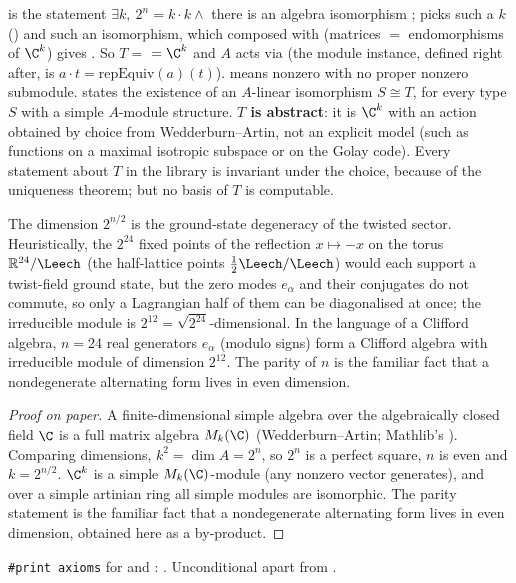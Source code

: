 \begin{dictionary}
 is the statement $\exists k,\ 2^n=k\cdot k\wedge$ there is an algebra
isomorphism ;  picks such a $k$
() and  such an isomorphism, which composed with
 (matrices $=$ endomorphisms of $\C^k$) gives .  So
$T=$  $=\C^k$ and $A$ acts via  (the module instance, defined right
after, is $a\cdot t=\mathrm{repEquiv}(a)(t)$).   means nonzero with no proper
nonzero submodule.   states the existence of an
$A$-linear isomorphism $S\cong T$, for every type $S$ with a simple $A$-module structure.
\textbf{$T$ is abstract}: it is $\C^k$ with an action obtained by choice from Wedderburn--Artin, not
an explicit model (such as functions on a maximal isotropic subspace or on the Golay code).  Every
statement about $T$ in the library is invariant under the choice, because of the uniqueness
theorem; but no basis of $T$ is computable.
\end{dictionary}

\begin{physics}
The dimension $2^{n/2}$ is the ground-state degeneracy of the twisted sector. Heuristically, the $2^{24}$ fixed points of the reflection $x\mapsto-x$ on the torus $\mathbb R^{24}/\Leech$ (the half-lattice points $\tfrac12\Leech/\Leech$) would each support a twist-field ground state, but the zero modes $e_\alpha$ and their conjugates do not commute, so only a Lagrangian half of them can be diagonalised at once; the irreducible module is $2^{12}=\sqrt{2^{24}}$-dimensional. In the language of a Clifford algebra, $n=24$ real generators $e_\alpha$ (modulo signs) form a Clifford algebra with irreducible module of dimension $2^{12}$. The parity of $n$ is the familiar fact that a nondegenerate alternating form lives in even dimension.
\end{physics}
\begin{proof}[Proof on paper]
A finite-dimensional simple algebra over the algebraically closed field $\C$ is a full matrix
algebra $M_k(\C)$ (Wedderburn--Artin; Mathlib's
).  Comparing dimensions,
$k^2=\dim A=2^n$, so $2^n$ is a perfect square, $n$ is even and $k=2^{n/2}$.  $\C^k$ is a simple
$M_k(\C)$-module (any nonzero vector generates), and over a simple artinian ring all simple modules
are isomorphic.  The parity statement  is the familiar fact that a
nondegenerate alternating form lives in even dimension, obtained here as a by-product.
\end{proof}
\begin{status}
\texttt{\#print axioms} for  and : .  Unconditional apart from .
\end{status}


